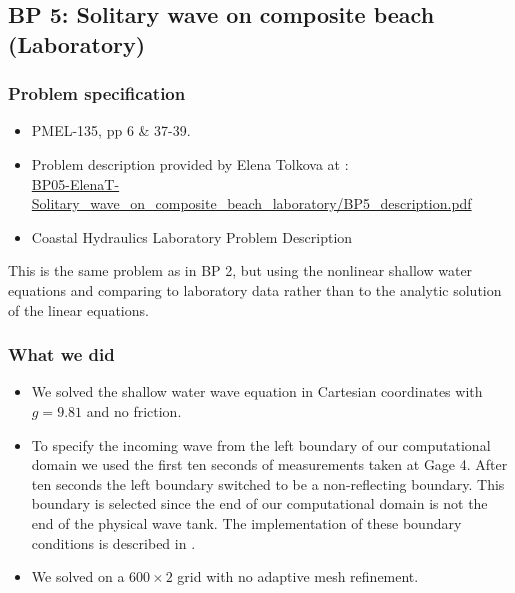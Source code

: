 \newsection

\subsection{BP 5:
 Solitary wave on composite beach (Laboratory) }


\subsubsection{Problem specification}

\begin{itemize}
\item PMEL-135, pp 6 \& 37-39.

\item Problem description provided by Elena Tolkova at
\cite{bp-description}:\\
\href{https://github.com/rjleveque/nthmp-benchmark-problems/blob/master/BP05-ElenaT-Solitary_wave_on_composite_beach_laboratory/BP5_description.pdf}
{BP05-ElenaT-Solitary\_wave\_on\_composite\_beach\_laboratory/BP5\_description.pdf} 

\item Coastal Hydraulics Laboratory Problem Description\cite{CHLBP2}
\end{itemize}

This is the same problem as in BP 2, but using the nonlinear shallow water
equations and comparing to laboratory data rather than to the analytic
solution of the linear equations.

\subsubsection{What we did}
\begin{itemize}
\item We solved the shallow water wave equation in Cartesian coordinates with $g = 9.81$ and no friction.
\item To specify the incoming wave from the left boundary of our
computational domain we used the first ten seconds of  measurements taken at
Gage 4.  After ten seconds the left boundary switched to be a non-reflecting
boundary.  This boundary is selected since the end of our computational
domain is not the end of the physical wave tank.  The implementation of
these boundary conditions is described in .
\item We solved on a $600 \times 2$ grid with no adaptive mesh refinement. 
\end{itemize}

